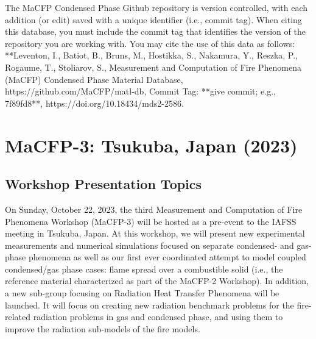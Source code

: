 \documentclass[12pt]{article}
\begin{document}
The MaCFP Condensed Phase Github repository is version controlled, with each addition (or edit) saved with a unique identifier (i.e., commit tag). When citing this database, you must include the commit tag that identifies the version of the repository you are working with. You may cite the use of this data as follows:\\ 
**Leventon, I., Batiot, B., Bruns, M., Hostikka, S., Nakamura, Y., Reszka, P., Rogaume, T., Stoliarov, S., Measurement and Computation of Fire Phenomena (MaCFP) Condensed Phase Material Database, https://github.com/MaCFP/matl-db, Commit Tag: **give commit; e.g., 7f89fd8**, https://doi.org/10.18434/mds2-2586.

\section{MaCFP-3: Tsukuba, Japan (2023)}
\subsection{Workshop Presentation Topics}

On Sunday, October 22, 2023, the third Measurement and Computation of Fire Phenomena Workshop (MaCFP-3) will be hosted as a pre-event to the IAFSS meeting in Tsukuba, Japan. At this workshop, we will present new experimental measurements and numerical simulations focused on separate condensed- and gas-phase phenomena as well as our first ever coordinated attempt to model coupled condensed/gas phase cases: flame spread over a combustible solid (i.e., the reference material characterized as part of the MaCFP-2 Workshop). In addition, a new sub-group focusing on Radiation Heat Transfer Phenomena will be launched. It will focus on creating new radiation benchmark problems for the fire-related radiation problems in gas and condensed phase, and using them to improve the radiation sub-models of the fire models. 
\end{document}
